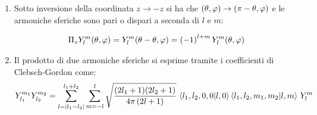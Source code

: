 \begin{enumerate}
	\item Sotto inversione della coordinata $z \to -z$ si ha che $\qty(\theta, \varphi) \to \qty(\pi - \theta, \varphi)$ e le armoniche sferiche sono pari o dispari a seconda di $l$ e $m$:
	
	\begin{align*}
		\Pi_{z} Y_l^m\qty(\theta, \varphi) = Y_l^m \qty(\theta -\theta, \varphi) = \qty(-1)^{l + m} \, Y_l^m \qty(\theta, \varphi)
	\end{align*}
	
	\item Il prodotto di due armoniche sferiche si esprime tramite i coefficienti di Clebsch-Gordon come:
	\begin{align*}
		Y_{l_1}^{m_1} Y_{l_2}^{m_2} = \sum_{l = |l_1 - l_2|}^{l_1 + l_2} \sum_{m = -l}^{l} \sqrt{\frac{\qty(2l_1 + 1)\qty(2l_2 + 1) }{4\pi \, \qty(2l + 1)}} \, \braket{l_1, l_2, 0, 0}{l, 0} \braket{l_1, l_2, m_1, m_2}{l, m} \, Y_l^m
	\end{align*}
	
\end{enumerate}

